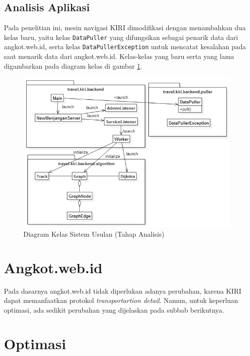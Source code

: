 \subsection{Analisis Aplikasi}

Pada penelitian ini, mesin navigasi KIRI dimodifikasi dengan menambahkan dua kelas baru, yaitu kelas \texttt{DataPuller} yang difungsikan sebagai penarik data dari angkot.web.id, serta kelas \texttt{DataPullerException} untuk mencatat kesalahan pada saat menarik data dari angkot.web.id. Kelas-kelas yang baru serta yang lama digambarkan pada diagram kelas di gambar \ref{fig:3_diagram_kelas_sistem_usulan}.

\begin{figure}
	\centering
	\includegraphics[scale=0.5]{Gambar/3_diagram_kelas_sistem_usulan}
	\caption{Diagram Kelas Sistem Usulan (Tahap Analisis)} 
	\label{fig:3_diagram_kelas_sistem_usulan}
\end{figure}

\section{Angkot.web.id}

Pada dasarnya angkot.web.id tidak diperlukan adanya perubahan, karena KIRI dapat memanfaatkan protokol \textit{transportartion detail}. Namun, untuk keperluan optimasi, ada sedikit perubahan yang dijelaskan pada subbab berikutnya.

\section{Optimasi}

